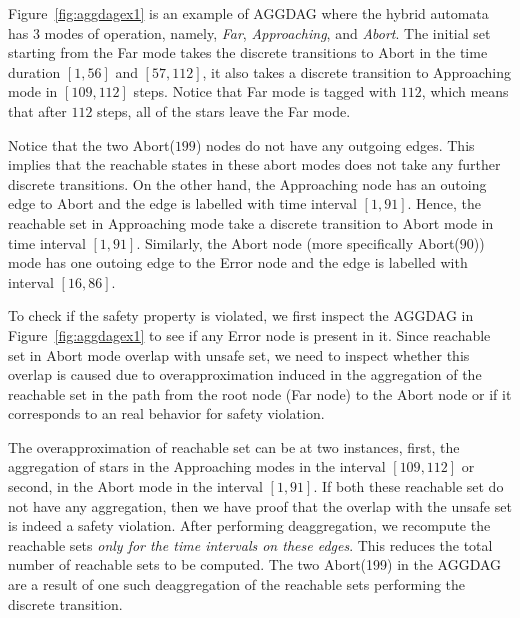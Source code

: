 \begin{example}
Figure~\ref{fig:aggdagex1} is an example of AGGDAG where the hybrid automata has 3 modes of operation, namely, {\em Far}, {\em Approaching}, and {\em Abort}. The initial set starting from the Far mode takes the discrete transitions to Abort in the time duration $[1,56]$ and $[57,112]$, it also takes a discrete transition to Approaching mode in $[109,112]$ steps. Notice that Far mode is tagged with $112$, which means that after $112$ steps, all of the stars leave the Far mode. 

Notice that the two Abort($199$) nodes do not have any outgoing edges. This implies that the reachable states in these abort modes does not take any further discrete transitions. On the other hand, the Approaching node has an outoing edge to Abort and the edge is labelled with time interval $[1,91]$. Hence, the reachable set in Approaching mode take a discrete transition to Abort mode in time interval $[1,91]$. Similarly, the Abort node (more specifically Abort($90$)) mode has one outoing edge to the Error node and the edge is labelled with interval $[16,86]$.

To check if the safety property is violated, we first inspect the AGGDAG in Figure~\ref{fig:aggdagex1} to see if any Error node is present in it. Since reachable set in Abort mode overlap with unsafe set, we need to inspect whether this overlap is caused due to overapproximation induced in the aggregation of the reachable set in the path from the root node (Far node) to the Abort node or if it corresponds to an real behavior for safety violation. 

The overapproximation of reachable set can be at two instances, first, the aggregation of stars in the Approaching modes in the interval $[109, 112]$ or second, in the Abort mode in the interval $[1,91]$.  If both these reachable set do not have any aggregation, then we have proof that the overlap with the unsafe set is indeed a safety violation. After performing deaggregation, we recompute the reachable sets \emph{only for the time intervals on these edges}. This reduces the total number of reachable sets to be computed. The two Abort(199) in the AGGDAG are a result of one such deaggregation of the reachable sets performing the discrete transition.
\end{example}



